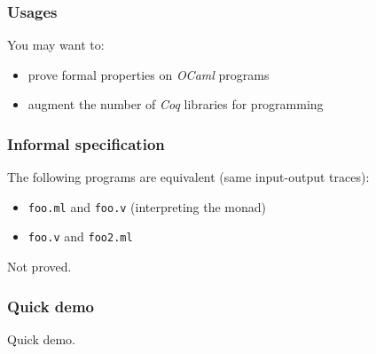 \documentclass[hyperref={pdfpagelabels=false}]{beamer}
\begin{document}
  \begin{frame}
    \frametitle{Usages}
    You may want to:
    \begin{itemize}
      \item prove formal properties on \emph{OCaml} programs
      \item augment the number of \emph{Coq} libraries for programming
    \end{itemize}
  \end{frame}
  \begin{frame}
    \frametitle{Informal specification}
    The following programs are equivalent (same input-output traces):
    \begin{itemize}
      \item \texttt{foo.ml} and \texttt{foo.v} (interpreting the monad)
      \item \texttt{foo.v} and \texttt{foo2.ml}
    \end{itemize}
    Not proved.
  \end{frame}
  \begin{frame}
    \frametitle{Quick demo}
    {\Huge Quick demo.}
  \end{frame}
\end{document}
